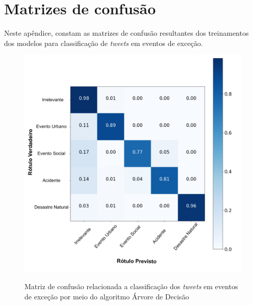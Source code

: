 \documentclass[
	12pt,				%
	oneside,			%
	a4paper,			%
	english,			%
	brazil				%
	]{abntex2ppgsi}
\begin{document}
{{\begin{apendicesenv}
\begin{longtable}{c|c|p{7cm}}
\end{longtable}

\normalsize

\chapter{Matrizes de confusão}
\label{apendiceE}

Neste apêndice, constam as matrizes de confusão resultantes dos treinamentos dos modelos para classificação de \textit{tweets} em eventos de exceção.

\begin{figure}[!htb]
	\centering
 	  \caption{Matriz de confusão relacionada a classificação dos \textit{tweets} em eventos de exceção por meio do algoritmo Árvore de Decisão}
		\includegraphics[width=1\linewidth]{images/confusion_matrix_dt_pt.png}
	\label{fig:confusion_matrix_dt}
\end{figure}


\end{apendicesenv}}}
\end{document}
